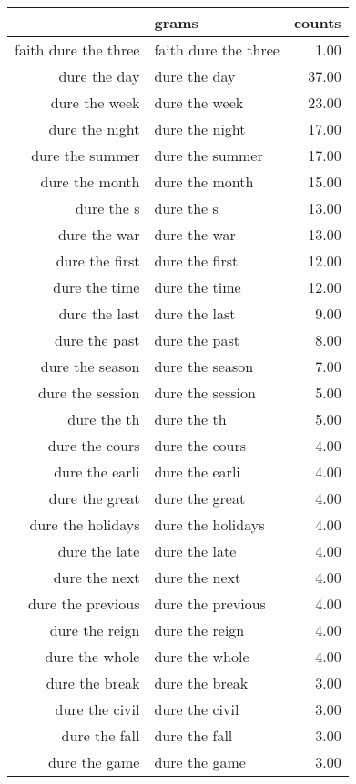 \begin{table}[ht]
\centering
\begin{tabular}{rlr}
  \hline
 & grams & counts \\ 
  \hline
faith dure the three & faith dure the three & 1.00 \\ 
  dure the day & dure the day & 37.00 \\ 
  dure the week & dure the week & 23.00 \\ 
  dure the night & dure the night & 17.00 \\ 
  dure the summer & dure the summer & 17.00 \\ 
  dure the month & dure the month & 15.00 \\ 
  dure the s & dure the s & 13.00 \\ 
  dure the war & dure the war & 13.00 \\ 
  dure the first & dure the first & 12.00 \\ 
  dure the time & dure the time & 12.00 \\ 
  dure the last & dure the last & 9.00 \\ 
  dure the past & dure the past & 8.00 \\ 
  dure the season & dure the season & 7.00 \\ 
  dure the session & dure the session & 5.00 \\ 
  dure the th & dure the th & 5.00 \\ 
  dure the cours & dure the cours & 4.00 \\ 
  dure the earli & dure the earli & 4.00 \\ 
  dure the great & dure the great & 4.00 \\ 
  dure the holidays & dure the holidays & 4.00 \\ 
  dure the late & dure the late & 4.00 \\ 
  dure the next & dure the next & 4.00 \\ 
  dure the previous & dure the previous & 4.00 \\ 
  dure the reign & dure the reign & 4.00 \\ 
  dure the whole & dure the whole & 4.00 \\ 
  dure the break & dure the break & 3.00 \\ 
  dure the civil & dure the civil & 3.00 \\ 
  dure the fall & dure the fall & 3.00 \\ 
  dure the game & dure the game & 3.00 \\ 

\end{tabular}
\end{table}
